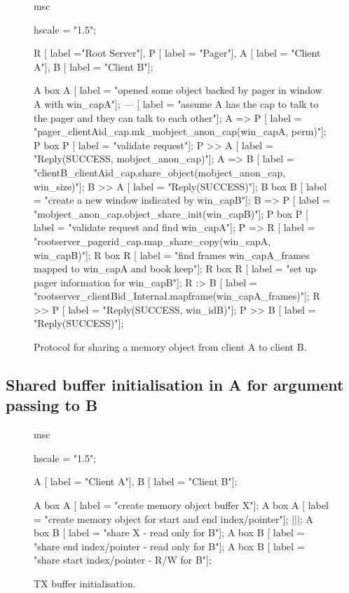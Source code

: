 \begin{figure}[htb]
\begin{center}
\begin{msc}
msc {
    hscale = "1.5";

    R [ label ="Root Server"],
    P [ label = "Pager"],
    A [ label = "Client A"],
    B [ label = "Client B"];
    
    A box A [ label = "opened some object backed by pager in window A with win\_capA"];
    --- [ label = "assume A has the cap to talk to the pager and they can talk to each other"];
    A => P [ label = "pager\_clientAid\_cap.mk\_mobject\_anon\_cap(win\_capA, perm)"];
    P box P [ label = "validate request"];
    P >> A [ label = "Reply(SUCCESS, mobject\_anon\_cap)"];
    A => B [ label = "clientB\_clientAid\_cap.share\_object(mobject\_anon\_cap, win\_size)"];
    B >> A [ label = "Reply(SUCCESS)"];
    B box B [ label = "create a new window indicated by win\_capB"];
    B => P [ label = "mobject\_anon\_cap.object\_share\_init(win\_capB)"];
    P box P [ label = "validate request and find win\_capA"];
    P => R [ label = "rootserver\_pagerid\_cap.map\_share\_copy(win\_capA, win\_capB)"];
    R box R [ label = "find frames win\_capA\_frames mapped to win\_capA and book keep"];
    R box R [ label = "set up pager information for win\_capB"];
    R :> B [ label = "rootserver\_clientBid\_Internal.mapframe(win\_capA\_frames)"];
    R >> P [ label = "Reply(SUCCESS, win\_idB)"];
    P >> B [ label = "Reply(SUCCESS)"];
}
\end{msc}
\end{center}
\caption{Protocol for sharing a memory object from client A to client B.}
\end{figure}


\subsection{Shared buffer initialisation in A for argument passing to B}

\begin{figure}[htb]
\begin{center}
\begin{msc}
msc {
    hscale = "1.5";

    A [ label = "Client A"],
    B [ label = "Client B"];
    
    A box A [ label = "create memory object buffer X"];
    A box A [ label = "create memory object for start and end index/pointer"];
    |||;
    A box B [ label = "share X - read only for B"];
    A box B [ label = "share end index/pointer - read only for B"];
    A box B [ label = "share start index/pointer - R/W for B"];
}
\end{msc}
\end{center}
\caption{TX buffer initialisation.}
\end{figure}

